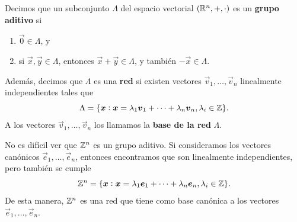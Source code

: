 \begin{definition}
	Decimos que un subconjunto $\Lambda$ del espacio vectorial $\left( \mathbb{R}^n, +, \cdot \right)$ es un
	\textbf{grupo aditivo} si
	\begin{enumerate}
		\item $\vec{0} \in \Lambda$, y
		\item si $\vec{x}, \vec{y} \in \Lambda$, entonces $\vec{x} + \vec{y} \in \Lambda$, y también
			$-\vec{x} \in \Lambda$.
	\end{enumerate}
	Además, decimos que $\Lambda$ es una \textbf{red} si existen vectores $\vec{v}_1, \ldots, \vec{v}_n$
	linealmente independientes tales que
	\begin{equation*}
		\Lambda = \lbrace \boldsymbol{x} \vcentcolon \boldsymbol{x} = \lambda_1\boldsymbol{v}_1 + \cdots +
		\lambda_n\boldsymbol{v}_n, \lambda_i \in
		\mathbb{Z} \rbrace.
	\end{equation*}
	A los vectores $\vec{v}_1, \ldots, \vec{v}_n$ los llamamos la \textbf{base de la red} $\Lambda$.
\end{definition}

\begin{example}
	No es difícil ver que $\mathbb{Z}^n$ es un grupo aditivo. Si consideramos los vectores canónicos
	$\vec{e}_1, \ldots, \vec{e}_n$, entonces encontramos que son linealmente independientes, pero
	también se cumple
	\begin{equation*}
		\mathbb{Z}^n = \lbrace \boldsymbol{x} \vcentcolon \boldsymbol{x} = \lambda_1\boldsymbol{e}_1 + \cdots + \lambda_n\boldsymbol{e}_n, \lambda_i \in
		\mathbb{Z} \rbrace.
	\end{equation*}
	De esta manera, $\mathbb{Z}^n$ es una red que tiene como base canónica a los vectores $\vec{e}_1,
	\ldots, \vec{e}_n$.
\end{example}

